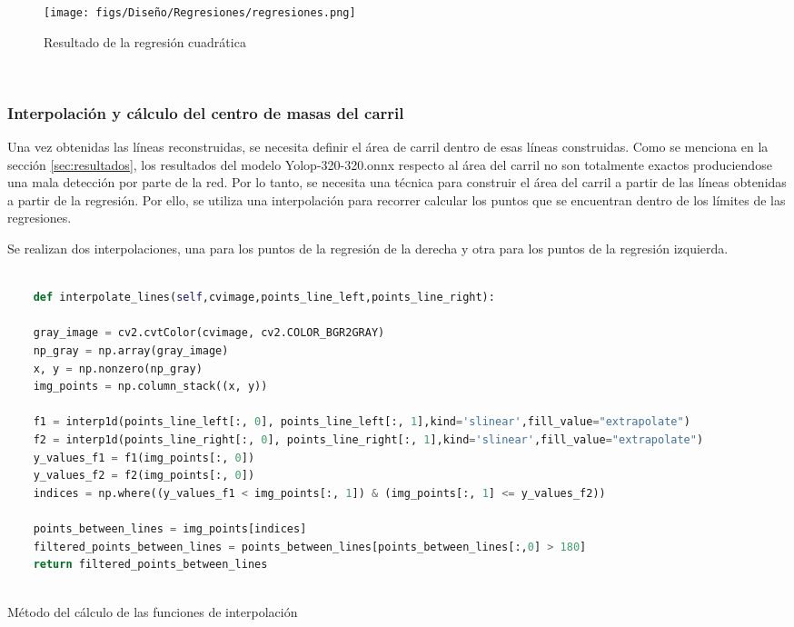 \begin{figure} [H]
  \begin{center}
    \texttt{[image: figs/Diseño/Regresiones/regresiones.png]}
  \end{center}
  \caption{Resultado de la regresión cuadrática}
  \label{fig:regresión cuadrática}
\end{figure}\

\subsubsection{Interpolación y cálculo del centro de masas del carril}
\label{sec:Interpolación y cálculo del centro de masas del carril}

Una vez obtenidas las líneas reconstruidas, se necesita definir el área de carril dentro de esas líneas construidas. Como se menciona en la sección 
\ref{sec:resultados}, los resultados del modelo Yolop-320-320.onnx respecto al área del carril no son totalmente exactos produciendose una mala detección por parte de la red. Por lo tanto, se necesita
una técnica para construir el área del carril a partir de las líneas obtenidas a partir de la regresión. Por ello, se utiliza una interpolación para recorrer calcular los puntos que se encuentran
dentro de los límites de las regresiones. \newline



Se realizan dos interpolaciones, una para 
los puntos de la regresión de la  derecha
y otra para los puntos de la regresión izquierda. 


\begin{code}[h]
  \begin{lstlisting}[language=Python]

    def interpolate_lines(self,cvimage,points_line_left,points_line_right):

    gray_image = cv2.cvtColor(cvimage, cv2.COLOR_BGR2GRAY) 
    np_gray = np.array(gray_image)
    x, y = np.nonzero(np_gray)
    img_points = np.column_stack((x, y))

    f1 = interp1d(points_line_left[:, 0], points_line_left[:, 1],kind='slinear',fill_value="extrapolate")
    f2 = interp1d(points_line_right[:, 0], points_line_right[:, 1],kind='slinear',fill_value="extrapolate") 
    y_values_f1 = f1(img_points[:, 0])
    y_values_f2 = f2(img_points[:, 0])
    indices = np.where((y_values_f1 < img_points[:, 1]) & (img_points[:, 1] <= y_values_f2))
    
    points_between_lines = img_points[indices]
    filtered_points_between_lines = points_between_lines[points_between_lines[:,0] > 180]
    return filtered_points_between_lines
    
  \end{lstlisting}
  \caption[Método de interpolación]{Método del cálculo de las funciones de interpolación}
  \label{cod:interpolación}
  \end{code}  

